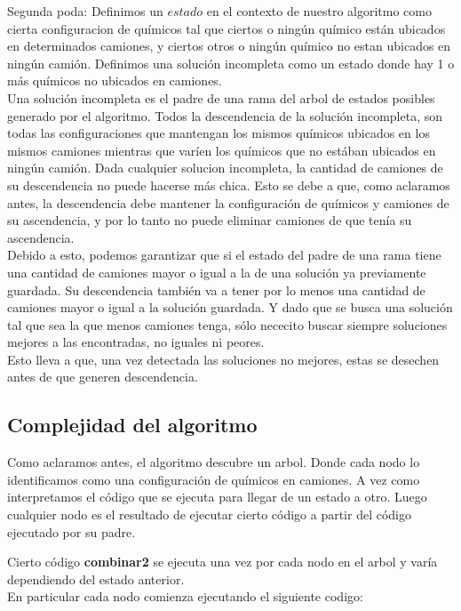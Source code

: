 \noindent
Segunda poda:
Definimos un $estado$ en el contexto de nuestro algoritmo como cierta configuracion de qu\'imicos tal que ciertos o ning\'un qu\'imico est\'an ubicados en determinados camiones, y ciertos otros o ning\'un qu\'imico no estan ubicados en ning\'un cami\'on.
Definimos una soluci\'on incompleta como un estado donde hay 1 o m\'as qu\'imicos no ubicados en camiones. \\
Una soluci\'on incompleta es el padre de una rama del arbol de estados posibles generado por el algoritmo. Todos la descendencia de la soluci\'on incompleta, son todas las configuraciones que mantengan los mismos qu\'imicos ubicados en los mismos camiones mientras que var\'ien los qu\'imicos que no est\'aban ubicados en ning\'un cami\'on.
Dada cualquier solucion incompleta, la cantidad de camiones de su descendencia no puede hacerse m\'as chica. Esto se debe a que, como aclaramos antes, la descendencia debe mantener la configuraci\'on de qu\'imicos y camiones de su ascendencia, y por lo tanto no puede eliminar camiones de que ten\'ia su ascendencia. \\
Debido a esto, podemos garantizar que si el estado del padre de una rama tiene una cantidad de camiones mayor o igual a la de una soluci\'on ya previamente guardada. Su descendencia tambi\'en va a tener por lo menos una cantidad de camiones mayor o igual a la soluci\'on guardada. Y dado que se busca una soluci\'on tal que sea la que menos camiones tenga, s\'olo nececito buscar siempre soluciones mejores a las encontradas, no iguales ni peores.\\
Esto lleva a que, una vez detectada las soluciones no mejores, estas se desechen antes de que generen descendencia.\\


\subsection{Complejidad del algoritmo}


\noindent
Como aclaramos antes, el algoritmo descubre un arbol. Donde cada nodo lo identificamos como una configuraci\'on de qu\'imicos en camiones. A vez como interpretamos el c\'odigo que se ejecuta para llegar de un estado a otro. Luego cualquier nodo es el resultado de ejecutar cierto c\'odigo a partir del c\'odigo ejecutado por su padre.

\noindent
Cierto c\'odigo \textbf{combinar2} se ejecuta una vez por cada nodo en el arbol y var\'ia dependiendo del estado anterior. \\
En particular cada nodo comienza ejecutando el siguiente codigo:

